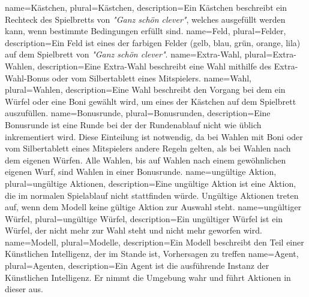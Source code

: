 {
	name=Kästchen,
	plural=Kästchen,
	description={Ein Kästchen beschreibt ein Rechteck des Spielbretts von \textit{"Ganz schön clever"}, welches ausgefüllt werden kann, wenn bestimmte Bedingungen erfüllt sind.}
}
{
	name=Feld,
	plural=Felder,
	description={Ein Feld ist eines der farbigen Felder (gelb, blau, grün, orange, lila) auf dem Spielbrett von \textit{"Ganz schön clever"}.}
}
{
	name=Extra-Wahl,
	plural=Extra-Wahlen,
	description={Eine Extra-Wahl beschreibt eine Wahl mithilfe des Extra-Wahl-Bonus oder vom Silbertablett eines Mitspielers.}
}
{
	name=Wahl,
	plural=Wahlen,
	description={Eine Wahl beschreibt den Vorgang bei dem ein Würfel oder eine Boni gewählt wird, um eines der Kästchen auf dem Spielbrett auszufüllen.\newpage}
}
{
	name=Bonusrunde,
	plural=Bonusrunden,
	description={Eine Bonusrunde ist eine Runde bei der der Rundenablauf nicht wie üblich inkrementiert wird. Diese Einteilung ist notwendig, da bei Wahlen mit Boni oder vom Silbertablett eines Mitspielers andere Regeln gelten, als bei Wahlen nach dem eigenen Würfen. Alle Wahlen, bis auf Wahlen nach einem gewöhnlichen eigenen Wurf, sind Wahlen in einer Bonusrunde.}
}
{
	name=ungültige Aktion,
	plural=ungültige Aktionen,
	description={Eine ungültige Aktion ist eine Aktion, die im normalen Spielablauf nicht stattfinden würde. Ungültige Aktionen treten auf, wenn dem Modell keine gültige Aktion zur Auswahl steht.}
}
{
	name=ungültiger Würfel,
	plural=ungültige Würfel,
	description={Ein ungültiger Würfel ist ein Würfel, der nicht mehr zur Wahl steht und nicht mehr geworfen wird.}
}
{
	name=Modell,
	plural=Modelle,
	description={Ein Modell beschreibt den Teil einer Künstlichen Intelligenz, der im Stande ist, Vorhersagen zu treffen}
}
{
	name=Agent,
	plural=Agenten,
	description={Ein Agent ist die ausführende Instanz der Künstlichen Intelligenz. Er nimmt die Umgebung wahr und führt Aktionen in dieser aus.}
}